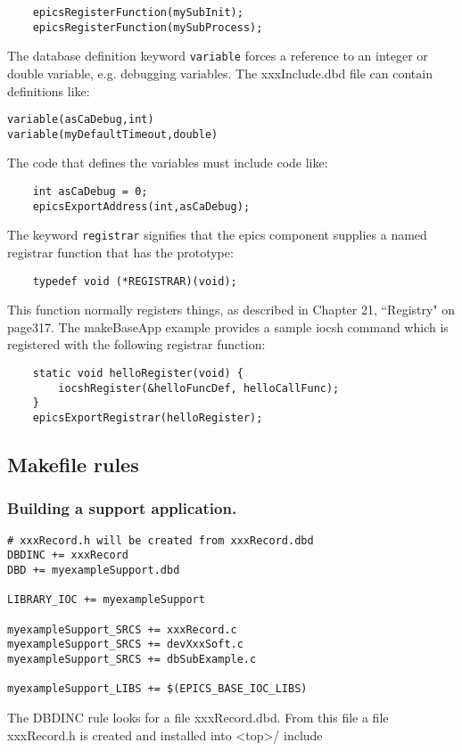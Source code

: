 \begin{verbatim}    epicsRegisterFunction(mySubInit);
    epicsRegisterFunction(mySubProcess);
\end{verbatim}The database definition keyword \verb|variable| forces a reference to an integer or double variable, e.g. debugging variables. 
The xxxInclude.dbd file can contain definitions like:

\begin{verbatim}variable(asCaDebug,int)
variable(myDefaultTimeout,double)
\end{verbatim}The code that defines the variables must include code like:

\begin{verbatim}    int asCaDebug = 0;
    epicsExportAddress(int,asCaDebug);
\end{verbatim}The keyword \verb|registrar| signifies that the epics component supplies a named registrar function that has the prototype:

\begin{verbatim}    typedef void (*REGISTRAR)(void);
\end{verbatim}This function normally registers things, as described in Chapter 21, ``Registry" on page317. The makeBaseApp example 
provides a sample iocsh command which is registered with the following registrar function:

\begin{verbatim}    static void helloRegister(void) {
        iocshRegister(&helloFuncDef, helloCallFunc);
    }
    epicsExportRegistrar(helloRegister);
\end{verbatim}
\subsection{Makefile rules}

\subsubsection{Building a support application.}

\begin{verbatim}# xxxRecord.h will be created from xxxRecord.dbd
DBDINC += xxxRecord
DBD += myexampleSupport.dbd

LIBRARY_IOC += myexampleSupport

myexampleSupport_SRCS += xxxRecord.c
myexampleSupport_SRCS += devXxxSoft.c
myexampleSupport_SRCS += dbSubExample.c

myexampleSupport_LIBS += $(EPICS_BASE_IOC_LIBS)
\end{verbatim}The DBDINC rule looks for a file xxxRecord.dbd. From this file a file xxxRecord.h is created and installed into \textless{}top\textgreater{}/
include

